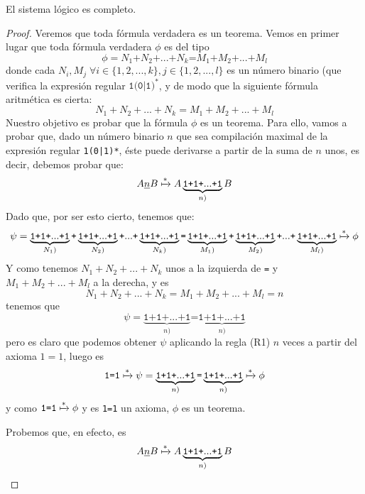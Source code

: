 \begin{proposicion}\label{prop:ap-comp}
El sistema lógico  es completo.
\end{proposicion}
\begin{proof}
Veremos que toda fórmula verdadera es un teorema. Vemos en primer lugar que toda fórmula verdadera $\phi$ es del tipo
$$\phi=N_1\texttt{+}N_2\texttt{+}...\texttt{+}N_k\texttt{=}M_1\texttt{+}M_2\texttt{+}...\texttt{+}M_l$$
donde cada $N_i, M_j\;\forall i\in\{1, 2, ..., k\}, j\in\{1, 2, ..., l\}$ es un número binario (que verifica la expresión regular $\texttt{1(0|1)}^\texttt{*}$, y de modo que la siguiente fórmula aritmética es cierta:
$$N_1+N_2+...+N_k=M_1+M_2+...+M_l$$
Nuestro objetivo es probar que la fórmula $\phi$ es un teorema. Para ello, vamos a probar que, dado un número binario $n$ que sea compilación maximal de la expresión regular \texttt{1(0|1)*}, éste puede derivarse a partir de la suma de $n$ unos, es decir, debemos probar que:
$$A\underline{n}B\xmapsto{*}A\underbrace{\texttt{1}\texttt{+}\texttt{1}\texttt{+}...\texttt{+}\texttt{1}}_{n)}B$$
Dado que, por ser esto cierto, tenemos que:
$$\psi=\underbrace{\texttt{1}\texttt{+}\texttt{1}\texttt{+}...\texttt{+}\texttt{1}}_{N_1)}\texttt{+}\underbrace{\texttt{1}\texttt{+}\texttt{1}\texttt{+}...\texttt{+}\texttt{1}}_{N_2)}\texttt{+}...\texttt{+}\underbrace{\texttt{1}\texttt{+}\texttt{1}\texttt{+}...\texttt{+}\texttt{1}}_{N_k)}\texttt{=}\underbrace{\texttt{1}\texttt{+}\texttt{1}\texttt{+}...\texttt{+}\texttt{1}}_{M_1)}\texttt{+}\underbrace{\texttt{1}\texttt{+}\texttt{1}\texttt{+}...\texttt{+}\texttt{1}}_{M_2)}\texttt{+}...\texttt{+}\underbrace{\texttt{1}\texttt{+}\texttt{1}\texttt{+}...\texttt{+}\texttt{1}}_{M_l)}\xmapsto{*}\phi$$
Y como tenemos $N_1+N_2+...+N_k$ unos a la izquierda de \texttt{=} y $M_1+M_2+...+M_l$ a la derecha, y es
$$N_1+N_2+...+N_k=M_1+M_2+...+M_l=n$$
tenemos que
$$\psi=\underbrace{\texttt{1}\texttt{+}\texttt{1}\texttt{+}...\texttt{+}\texttt{1}}_{n)}\texttt{=}\underbrace{\texttt{1}\texttt{+}\texttt{1}\texttt{+}...\texttt{+}\texttt{1}}_{n)}$$
pero es claro que podemos obtener $\psi$ aplicando la regla (R1) $n$ veces a partir del axioma $1=1$, luego es
$$\texttt{1=1}\xmapsto{*}\psi=\underbrace{\texttt{1}\texttt{+}\texttt{1}\texttt{+}...\texttt{+}\texttt{1}}_{n)}\texttt{=}\underbrace{\texttt{1}\texttt{+}\texttt{1}\texttt{+}...\texttt{+}\texttt{1}}_{n)}\xmapsto{*}\phi$$
y como $\texttt{1=1}\xmapsto{*}\phi$ y es \texttt{1=1} un axioma, $\phi$ es un teorema.

Probemos que, en efecto, es
$$A\underline{n}B\xmapsto{*}A\underbrace{\texttt{1}\texttt{+}\texttt{1}\texttt{+}...\texttt{+}\texttt{1}}_{n)}B$$


\end{proof}
